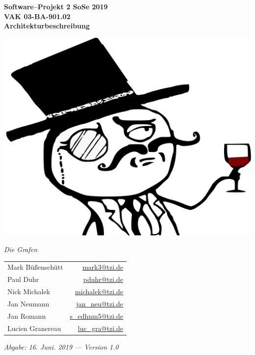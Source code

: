 \documentclass[enabledeprecatedfontcommands,fontsize=12pt,paper=a4,twoside,parskip=half]{scrartcl}
\newcommand{\emaillink}[1]{\href{mailto:#1}{#1}}
\begin{document}

  \thispagestyle{fancy}
  \fancyhead[LO,RE]{ }
  \fancyfoot[C]{}

\begin{center}
  \vspace{3cm}
  
  \Large{\textbf{Software--Projekt 2 SoSe 2019}}\\[.5em]
  \small{\textbf{VAK 03-BA-901.02}}\\
  \vfill
  \Large{\textbf{Architekturbeschreibung}}\\
  
  \vfill
  
  \includegraphics[width=.45\textwidth]{Bilder/monocle-155626.pdf}
  
  \LARGE{\textit{Die Grafen}}
  \vfill
  \sffamily
  \begin{table}[H]
  \centering
  \begin{tabular}{lr}
      Mark Büßenschütt & \emaillink{mark3@tzi.de} \\
      Paul Duhr & \emaillink{pduhr@tzi.de} \\
      Nick Michalek & \emaillink{michalek@tzi.de} \\
      Jan Neumann & \emaillink{jan\_neu@tzi.de} \\
      Jan Romann & \emaillink{s\_edhnm5@tzi.de} \\
      Lucien Granereau & \emaillink{luc\_gra@tzi.de} \\
  \end{tabular}
  \end{table}
  
  \vfill
  \textit{\large{Abgabe: 16. Juni. 2019 --- Version 1.0}} 
  \rmfamily
\end{center}
\end{document}
